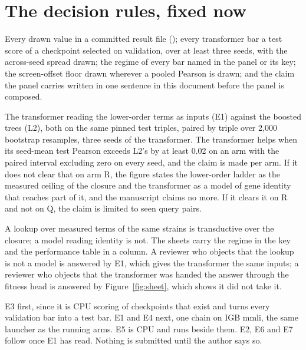 
\clearpage
\section{The decision rules, fixed now}
\label{sec:state}

 Every drawn value in a committed result
file (); every transformer bar a test score of a checkpoint selected on
validation, over at least three seeds, with the across-seed spread drawn; the regime of
every bar named in the panel or its key; the screen-offset floor drawn wherever a pooled
Pearson is drawn; and the claim the panel carries written in one sentence in this
document before the panel is composed.

 The transformer reading the
lower-order terms as inputs (E1) against the boosted trees (L2), both on the same pinned
test triples, paired by triple over 2,000 bootstrap resamples, three seeds of the
transformer. The transformer helps when its seed-mean test Pearson exceeds L2's by at
least 0.02 on an arm with the paired interval excluding zero on every seed, and the claim
is made per arm. If it does not clear that on arm R, the figure states the lower-order
ladder as the measured ceiling of the closure and the transformer as a model of gene
identity that reaches part of it, and the manuscript claims no more. If it clears it on R
and not on Q, the claim is limited to seen query pairs.

 A lookup over measured terms of the
same strains is transductive over the closure; a model reading identity is not. The
sheets carry the regime in the key and the performance table in a column. A reviewer who
objects that the lookup is not a model is answered by E1, which gives the transformer the
same inputs; a reviewer who objects that the transformer was handed the answer through
the fitness head is answered by Figure~\ref{fig:sheet}, which shows it did not take it.

 E3 first, since it is CPU scoring of checkpoints that exist and
turns every validation bar into a test bar. E1 and E4 next, one chain on IGB mmli, the
same launcher as the running arms. E5 is CPU and runs beside them. E2, E6 and E7 follow
once E1 has read. Nothing is submitted until the author says so.
